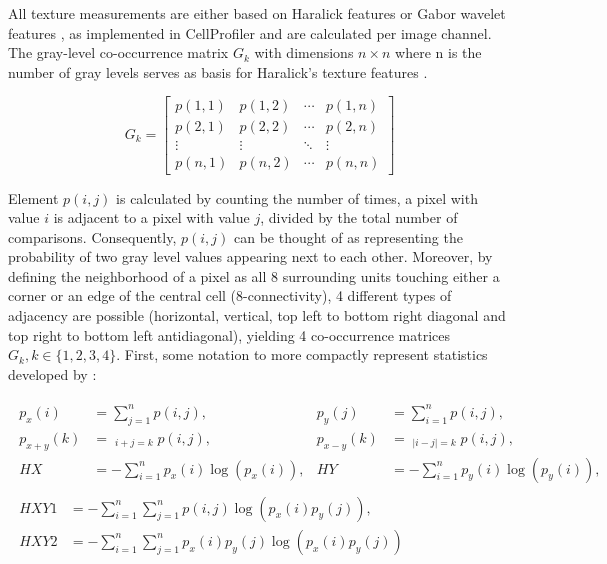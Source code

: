 All texture measurements are either based on Haralick features \citep{Haralick1973} or Gabor wavelet features \citep{Gabor1946}, as implemented in CellProfiler and are calculated per image channel. The gray-level co-occurrence matrix $G_k$ with dimensions $n \times n$ where n is the number of gray levels serves as basis for Haralick's texture features \citep{Carpenter2006}.

\begin{equation}
  G_k = \begin{bmatrix}
    p(1,1) & p(1,2) & \cdots & p(1,n) \\
    p(2,1) & p(2,2) & \cdots & p(2,n) \\
    \vdots  & \vdots  & \ddots & \vdots  \\
    p(n,1) & p(n,2) & \cdots & p(n,n) 
  \end{bmatrix}
\end{equation}

Element $p(i,j)$ is calculated by counting the number of times, a pixel with value $i$ is adjacent to a pixel with value $j$, divided by the total number of comparisons. Consequently, $p(i,j)$ can be thought of as representing the probability of two gray level values appearing next to each other. Moreover, by defining the neighborhood of a pixel as all 8 surrounding units touching either a corner or an edge of the central cell (8-connectivity), 4 different types of adjacency are possible (horizontal, vertical, top left to bottom right diagonal and top right to bottom left antidiagonal), yielding 4 co-occurrence matrices $G_k, k\in\{1,2,3,4\}$. First, some notation to more compactly represent statistics developed by \citeauthor{Haralick1973}:

\begin{gather*}
\begin{align*}
p_x(i) &= \sum_{j=1}^{n} p(i,j), & p_y(j) &= \sum_{i=1}^{n} p(i,j), \\
p_{x+y}(k) &= \mathop{\sum_{i=1}^{n}\sum_{j=1}^{n}}_{i+j=k} p(i,j), &
  p_{x-y}(k) &= \mathop{\sum_{i=1}^{n}\sum_{j=1}^{n}}_{\lvert i-j\rvert=k} p(i,j), \\
  HX &= -\sum_{i=1}^{n} p_x(i) \log\left(p_x(i)\right), &
  HY &= -\sum_{i=1}^{n} p_y(i) \log\left(p_y(i)\right),
\end{align*}\\
\begin{split}
  HXY1 &= -\sum_{i=1}^{n} \sum_{j=1}^{n} p(i,j) \log\left(p_x(i)p_y(j)\right), \\
  HXY2 &= -\sum_{i=1}^{n} \sum_{j=1}^{n} p_x(i)p_y(j) \log\left(p_x(i)p_y(j)\right)
\end{split}
\end{gather*}

